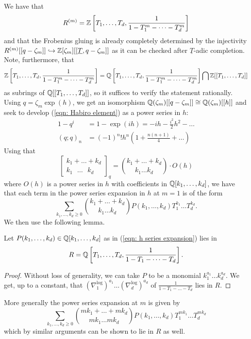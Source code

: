 We have that 
$$R^{(m)}=\mathbb{Z}\left[T_{1},\dots,T_{d},\frac{1}{1-T_{1}^{m}-\dots -T_{d}^{m}}\right]$$
and that the Frobenius gluing is already completely determined by the injectivity $R^{(m)}[[q-\zeta_{m}]]\hookrightarrow\mathbb{Z}[\zeta_{m}][[\underline{T},q-\zeta_{m}]]$ as it can be checked after $\underline{T}$-adic completion. Note, furthermore, that 
{\footnotesize
$$\mathbb{Z}\left[T_{1},\dots,T_{d},\frac{1}{1-T_{1}^{m}-\dots-T_{d}^{m}}\right]=\mathbb{Q}\left[T_{1},\dots,T_{d},\frac{1}{1-T_{1}^{m}-\dots-T_{d}^{m}}\right]\bigcap\mathbb{Z}[[T_{1},\dots,T_{d}]]$$
\normalsize}as subrings of $\mathbb{Q}[[T_{1},\dots,T_{d}]]$, so it suffices to verify the statement rationally. Using $q=\zeta_{m}\exp(h)$, we get an isomorphism $\mathbb{Q}(\zeta_{m})[[q-\zeta_{m}]]\cong\mathbb{Q}(\zeta_{m})[[h]]$ and seek to develop (\ref{eqn: Habiro element}) as a power series in $h$: 
\begin{align*}
    1-q^{i} &= 1-\exp(ih) = -ih - \frac{i^{2}}{2} h^{2}-\dots \\
    (q;q)_{n}&=(-1)^{n}!h^{n}\left(1 + \frac{n(n+1)}{4}+\dots\right)
\end{align*}
Using that 
$$\left[\substack{k_{1}+\dots+k_{d} \\ k_{1}\text{ }\dots\text{ }k_{d}}\right]_{q}=\binom{k_{1}+\dots+k_{d}}{k_{1}\dots k_{d}}\cdot O(h)$$
where $O(h)$ is a power series in $h$ with coefficients in $\mathbb{Q}[k_{1},\dots,k_{d}]$, we have that each term in the power series expansion in $h$ at $m=1$ is of the form 
\begin{equation}\label{eqn: h series expansion}
    \sum_{k_{1},\dots,k_{d}\geq0}\binom{k_{1}+\dots+k_{d}}{k_{1}\dots k_{d}}P(k_{1},\dots,k_{d})T_{1}^{k_{1}}\dots T_{d}^{k_{d}}.
\end{equation}
We then use the following lemma. 
\begin{lemma}
    Let $P(k_{1},\dots, k_{d})\in\mathbb{Q}[k_{1},\dots,k_{d}]$ as in (\ref{eqn: h series expansion}) lies in $$R=\mathbb{Q}\left[T_{1},\dots,T_{d},\frac{1}{1-T_{1}-\dots-T_{d}}\right].$$ 
\end{lemma}
\begin{proof}
    Without loss of generality, we can take $P$ to be a monomial $k_{1}^{a_{1}}\dots k_{d}^{a_{d}}$. We get, up to a constant, that $(\nabla_{1}^{\log})^{a_{1}}\dots(\nabla_{d}^{\log})^{a_{d}}$ of $\frac{1}{1-T_{1}-\dots-T_{d}}$ lies in $R$. 
\end{proof}
More generally the power series expansion at $m$ is given by 
\begin{equation}\label{eqn: h series expansion at m}
    \sum_{k_{1},\dots,k_{d}\geq0}\binom{mk_{1}+\dots+mk_{d}}{mk_{1}\dots mk_{d}}P(k_{1},\dots,k_{d})T_{1}^{mk_{1}}\dots T_{d}^{mk_{d}}
\end{equation}
which by similar arguments can be shown to lie in $R$ as well. 